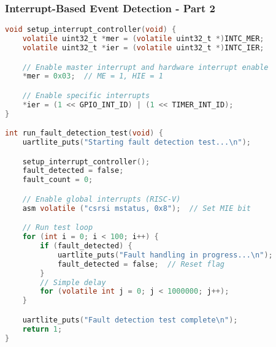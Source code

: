 \documentclass{beamer}
\begin{document}
\begin{frame}[fragile]
\frametitle{Interrupt-Based Event Detection - Part 2}
\begin{lstlisting}[language=C, basicstyle=\fontsize{5}{2}\selectfont\ttfamily, backgroundcolor={}]
void setup_interrupt_controller(void) {
    volatile uint32_t *mer = (volatile uint32_t *)INTC_MER;
    volatile uint32_t *ier = (volatile uint32_t *)INTC_IER;

    // Enable master interrupt and hardware interrupt enable
    *mer = 0x03;  // ME = 1, HIE = 1

    // Enable specific interrupts
    *ier = (1 << GPIO_INT_ID) | (1 << TIMER_INT_ID);
}

int run_fault_detection_test(void) {
    uartlite_puts("Starting fault detection test...\n");

    setup_interrupt_controller();
    fault_detected = false;
    fault_count = 0;

    // Enable global interrupts (RISC-V)
    asm volatile ("csrsi mstatus, 0x8");  // Set MIE bit

    // Run test loop
    for (int i = 0; i < 100; i++) {
        if (fault_detected) {
            uartlite_puts("Fault handling in progress...\n");
            fault_detected = false;  // Reset flag
        }
        // Simple delay
        for (volatile int j = 0; j < 1000000; j++);
    }

    uartlite_puts("Fault detection test complete\n");
    return 1;
}
\end{lstlisting}
\end{frame}
\end{document}
